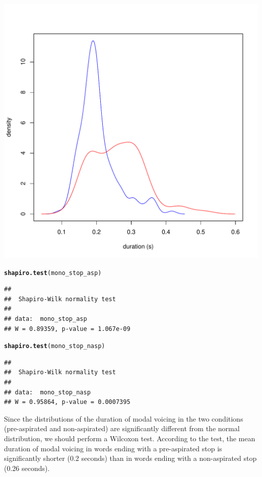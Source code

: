 \documentclass[a4paper,11pt]{article}\usepackage[]{graphicx}\usepackage[]{color}
\makeatletter
\def\maxwidth{ %
  \ifdim\Gin@nat@width>\linewidth
    \linewidth
  \else
    \Gin@nat@width
  \fi
}
\newcommand{\hlstd}[1]{\textcolor[rgb]{0.345,0.345,0.345}{#1}}%
\newcommand{\hlkwd}[1]{\textcolor[rgb]{0.737,0.353,0.396}{\textbf{#1}}}%
\newenvironment{kframe}{%
 \def\at@end@of@kframe{}%
 \ifinner\ifhmode%
  \def\at@end@of@kframe{\end{minipage}}%
  \begin{minipage}{\columnwidth}%
 \fi\fi%
 \def\FrameCommand##1{\hskip\@totalleftmargin \hskip-\fboxsep
 \colorbox{shadecolor}{##1}\hskip-\fboxsep
     \hskip-\linewidth \hskip-\@totalleftmargin \hskip\columnwidth}%
 \MakeFramed {\advance\hsize-\width
   \@totalleftmargin\z@ \linewidth\hsize
   \@setminipage}}%
 {\par\unskip\endMakeFramed%
 \at@end@of@kframe}
\newenvironment{knitrout}{}{} %
\makeatother
\begin{document}
\begin{knitrout}
{\centering \includegraphics[width=\maxwidth]{img/mono-stop-dens-1} 

}



\end{knitrout}

\begin{knitrout}
\color{fgcolor}\begin{kframe}
\begin{alltt}
\hlkwd{shapiro.test}\hlstd{(mono_stop_asp)}
\end{alltt}
\begin{verbatim}
## 
## 	Shapiro-Wilk normality test
## 
## data:  mono_stop_asp
## W = 0.89359, p-value = 1.067e-09
\end{verbatim}
\begin{alltt}
\hlkwd{shapiro.test}\hlstd{(mono_stop_nasp)}
\end{alltt}
\begin{verbatim}
## 
## 	Shapiro-Wilk normality test
## 
## data:  mono_stop_nasp
## W = 0.95864, p-value = 0.0007395
\end{verbatim}
\end{kframe}
\end{knitrout}

Since the distributions of the duration of modal voicing in the two conditions (pre-aspirated and non-aspirated) are significantly different from the normal distribution, we should perform a Wilcoxon test.
According to the test, the mean duration of modal voicing in words ending with a pre-aspirated stop is significantly shorter (0.2 seconds) than in words ending with a non-aspirated stop (0.26 seconds).
\end{document}

